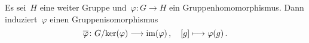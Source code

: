 \begin{theorem}[Homomorphiesatz]
\end{theorem}

\begin{corollary}
  Es sei~$H$ eine weiter Gruppe und~$\varphi \colon G \to H$ ein Gruppenhomomorphismus.
  Dann induziert~$\varphi$ einen Gruppenisomorphismus
  \[
    \induced{\varphi}
    \colon
    G/{\ker(\varphi)} \to \im(\varphi) \,,
    \quad
    \class{g}
    \mapsto
    \varphi(g) \,.
  \]
\end{corollary}

